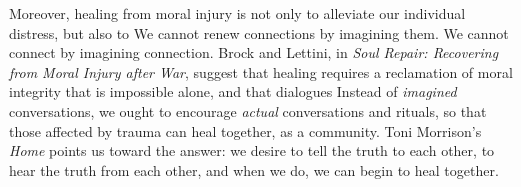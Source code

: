 \documentclass[12pt]{article}
\begin{document}
Moreover, healing from moral injury is not only to alleviate our individual
distress, but also to \autocite[p.~116]{Brock12} We cannot renew connections by imagining them.
We cannot connect by imagining connection.  Brock and Lettini, in \textit{Soul
Repair: Recovering from Moral Injury after War},\autocite{Brock12} suggest that
healing requires a reclamation of moral integrity that is impossible alone, and
that dialogues \autocite[p.~112]{Brock12} Instead of \emph{imagined}
conversations, we ought to encourage \emph{actual} conversations and
rituals,\autocite{Brock15} so that those affected by trauma can heal together,
as a community. Toni Morrison's \emph{Home} points us toward the answer: we
desire to tell the truth to each other, to hear the truth from each other, and
when we do, we can begin to heal together.

\clearpage
\printbibliography

\clearpage





 


\end{document}
